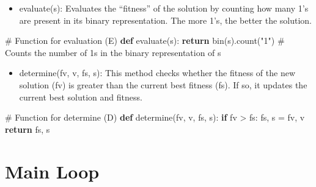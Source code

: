 \documentclass[
  letterpaper,
  DIV=11,
  numbers=noendperiod]{scrreprt}
\newenvironment{Shaded}{\begin{snugshade}}{\end{snugshade}}
\newcommand{\BuiltInTok}[1]{\textcolor[rgb]{0.00,0.23,0.31}{#1}}
\newcommand{\CommentTok}[1]{\textcolor[rgb]{0.37,0.37,0.37}{#1}}
\newcommand{\ControlFlowTok}[1]{\textcolor[rgb]{0.00,0.23,0.31}{\textbf{#1}}}
\newcommand{\KeywordTok}[1]{\textcolor[rgb]{0.00,0.23,0.31}{\textbf{#1}}}
\newcommand{\NormalTok}[1]{\textcolor[rgb]{0.00,0.23,0.31}{#1}}
\newcommand{\OperatorTok}[1]{\textcolor[rgb]{0.37,0.37,0.37}{#1}}
\newcommand{\StringTok}[1]{\textcolor[rgb]{0.13,0.47,0.30}{#1}}
\providecommand{\tightlist}{%
  \setlength{\itemsep}{0pt}\setlength{\parskip}{0pt}}\usepackage{longtable,booktabs,array}
\begin{document}
\begin{itemize}
\tightlist
\item
  evaluate(s): Evaluates the ``fitness'' of the solution by counting how
  many 1's are present in its binary representation. The more 1's, the
  better the solution.
\end{itemize}

\begin{Shaded}
\begin{Highlighting}[]
\CommentTok{\# Function for evaluation (E)}
\KeywordTok{def}\NormalTok{ evaluate(s):}
    \ControlFlowTok{return} \BuiltInTok{bin}\NormalTok{(s).count(}\StringTok{"1"}\NormalTok{)  }\CommentTok{\# Counts the number of 1s in the binary representation of s}
\end{Highlighting}
\end{Shaded}

\begin{itemize}
\tightlist
\item
  determine(fv, v, fs, s): This method checks whether the fitness of the
  new solution (fv) is greater than the current best fitness (fs). If
  so, it updates the current best solution and fitness.
\end{itemize}

\begin{Shaded}
\begin{Highlighting}[]
\CommentTok{\# Function for determine (D)}
\KeywordTok{def}\NormalTok{ determine(fv, v, fs, s):}
    \ControlFlowTok{if}\NormalTok{ fv }\OperatorTok{\textgreater{}}\NormalTok{ fs:}
\NormalTok{        fs, s }\OperatorTok{=}\NormalTok{ fv, v}
    \ControlFlowTok{return}\NormalTok{ fs, s}
\end{Highlighting}
\end{Shaded}

\section{Main Loop}\label{main-loop}
\end{document}
